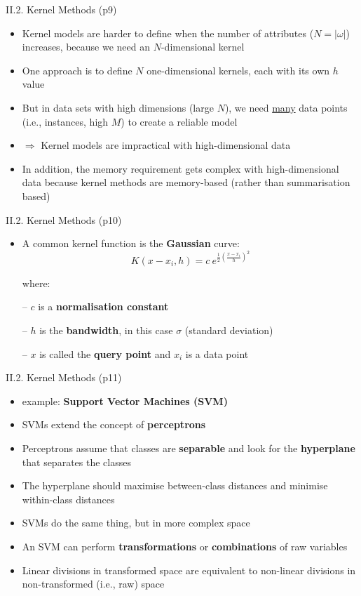 \documentclass[handout]{beamer}
\newcommand{\strong}[1]{\textbf{\color{teal} #1}}
\newcommand{\stronger}[1]{\textbf{\color{purple} #1}}
\begin{document}
\begin{frame}{II.2. Kernel Methods (p9)}
\begin{itemize}
\item Kernel models are harder to define when the number of attributes ($N = |\omega|$) increases, because we need an $N$-dimensional kernel
\item One approach is to define $N$ one-dimensional kernels, each with its own $h$ value
\item But in data sets with high dimensions (large $N$), we need \underline{many} data points (i.e., instances, high $M$) to create a reliable model
\item $\Rightarrow$ Kernel models are impractical with high-dimensional data
\item In addition, the memory requirement gets complex with high-dimensional data because kernel methods are memory-based (rather than summarisation based)
\end{itemize}
\end{frame}
\begin{frame}{II.2. Kernel Methods (p10)}
\begin{itemize}
\item A common kernel function is the \stronger{Gaussian} curve:
\[
K(x - x_i,h) = c ~ e^{\frac{1}{2}(\frac{x - x_i}{h})^2}
\]
\item[] where:
\item[--] $c$ is a \stronger{normalisation constant}
\item[--] $h$ is the \stronger{bandwidth}, in this case $\sigma$ (standard deviation)
\item[--] $x$ is called the \stronger{query point} and $x_i$ is a data point
\end{itemize}
\end{frame}
\begin{frame}{II.2. Kernel Methods (p11)} %
\begin{itemize}
\item example: \stronger{Support Vector Machines (SVM)}
\item SVMs extend the concept of \stronger{perceptrons}
\item Perceptrons assume that classes are \strong{separable} and look for the \strong{hyperplane} that separates the classes
\item The hyperplane should maximise between-class distances and minimise within-class distances
\item SVMs do the same thing, but in more complex space
\item An SVM can perform \strong{transformations} or \strong{combinations} of raw variables
\item Linear divisions in transformed space are equivalent to non-linear divisions in non-transformed (i.e., raw) space
\end{itemize}
\end{frame}
\end{document}
